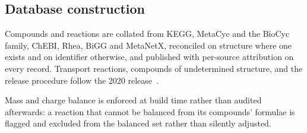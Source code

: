\subsection{Database construction}\label{sec:methods-construction}

Compounds and reactions are collated from KEGG, MetaCyc and the BioCyc family,
ChEBI, Rhea, BiGG and MetaNetX, reconciled on structure where one exists and on
identifier otherwise, and published with per-source attribution on every
record. Transport reactions, compounds of undetermined structure, and the
release procedure follow the 2020 release~\cite{seaver2020}.

Mass and charge balance is enforced at build time rather than audited
afterwards: a reaction that cannot be balanced from its compounds' formulae is
flagged and excluded from the balanced set rather than silently adjusted.
